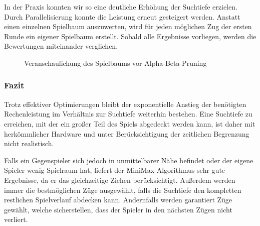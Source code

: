 \documentclass[12pt,a4paper]{article}
\begin{document}
In der Praxis konnten wir so eine deutliche Erhöhung der Suchtiefe erzielen. Durch Parallelisierung konnte die Leistung erneut gesteigert werden. Anstatt einen einzelnen Spielbaum auszuwerten, wird für jeden möglichen Zug der ersten Runde ein eigener Spielbaum erstellt. Sobald alle Ergebnisse vorliegen, werden die Bewertungen miteinander verglichen.

\begin{figure}[h]
    \centering
    \caption{Veranschaulichung des Spielbaums vor Alpha-Beta-Pruning}
    \label{fig:minimax-pruning}
\end{figure}

\subsubsection{Fazit}
Trotz effektiver Optimierungen bleibt der exponentielle Anstieg der benötigten Rechenleistung im Verhältnis zur Suchtiefe weiterhin bestehen. Eine Suchtiefe zu erreichen, mit der ein großer Teil des Spiels abgedeckt werden kann, ist daher mit herkömmlicher Hardware und unter Berücksichtigung der zeitlichen Begrenzung nicht realistisch.

Falls ein Gegenspieler sich jedoch in unmittelbarer Nähe befindet oder der eigene Spieler wenig Spielraum hat, liefert der MiniMax-Algorithmus sehr gute Ergebnisse, da er das gleichzeitige Ziehen berücksichtigt. Außerdem werden immer die bestmöglichen Züge ausgewählt, falls die Suchtiefe den kompletten restlichen Spielverlauf abdecken kann. Andernfalls werden garantiert Züge gewählt, welche sicherstellen, dass der Spieler in den nächsten Zügen nicht verliert.
\end{document}
